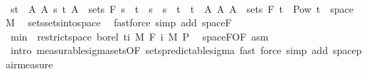 \begin{isabellebody}
\ \ \isacommand{{\isacharbraceright}{\kern0pt}}\isamarkupfalse%
\isanewline
\ \ \isamarkupfalse%
\ \isamarkupfalse%
\ {\isachardoublequoteopen}{\isacharbraceleft}{\kern0pt}{\isacharbraceleft}{\kern0pt}s{\isacharless}{\kern0pt}{\isachardot}{\kern0pt}{\isachardot}{\kern0pt}t{\isacharbraceright}{\kern0pt}\ {\isasymtimes}\ A\ {\isacharbar}{\kern0pt}A\ s\ t{\isachardot}{\kern0pt}\ A\ {\isasymin}\ sets\ {\isacharparenleft}{\kern0pt}F\ s{\isacharparenright}{\kern0pt}\ {\isasymand}\ t\ {\isasymle}\ s\ {\isasymand}\ s\ {\isacharless}{\kern0pt}\ t{\isacharbraceright}{\kern0pt}\ {\isasymunion}\ {\isacharbraceleft}{\kern0pt}{\isacharbraceleft}{\kern0pt}t\ {\isasymtimes}\ A\ {\isacharbar}{\kern0pt}A{\isachardot}{\kern0pt}\ A\ {\isasymin}\ sets\ {\isacharparenleft}{\kern0pt}F\ t\ {\isasymsubseteq}\ Pow\ {\isacharparenleft}{\kern0pt}{\isacharbraceleft}{\kern0pt}t\ {\isasymtimes}\ space\ M{\isacharparenright}{\kern0pt}{\isachardoublequoteclose}\ \isamarkupfalse%
\ sets{\isachardot}{\kern0pt}sets{\isacharunderscore}{\kern0pt}into{\isacharunderscore}{\kern0pt}space\ \isamarkupfalse%
\ {\isacharparenleft}{\kern0pt}fastforce\ simp\ add{\isacharcolon}{\kern0pt}\ space{\isacharunderscore}{\kern0pt}F{\isacharparenright}{\kern0pt}\isanewline
\ \ \isamarkupfalse%
\ \isamarkupfalse%
\ {\isachardoublequoteopen}{\isacharquery}{\kern0pt}min\ {\isasymin}\ restrict{\isacharunderscore}{\kern0pt}space\ borel\ {\isacharbraceleft}{\kern0pt}ti{\isacharbraceright}{\kern0pt}\ {\isasymOtimes}\isactrlsub M\ F\ i\ {\isasymrightarrow}\isactrlsub M\ {\isasymSigma}\isactrlsub P{\isachardoublequoteclose}\ \isamarkupfalse%
\ space{\isacharunderscore}{\kern0pt}F{\isacharbrackleft}{\kern0pt}OF\ asm{\isacharbrackright}{\kern0pt}\ \isamarkupfalse%
\ {\isacharparenleft}{\kern0pt}intro\ measurable{\isacharunderscore}{\kern0pt}sigma{\isacharunderscore}{\kern0pt}sets{\isacharbrackleft}{\kern0pt}OF\ sets{\isacharunderscore}{\kern0pt}predictable{\isacharunderscore}{\kern0pt}sigma{\isacharbrackright}{\kern0pt}{\isacharparenright}{\kern0pt}\ {\isacharparenleft}{\kern0pt}fast{\isacharcomma}{\kern0pt}\ force\ simp\ add{\isacharcolon}{\kern0pt}\ space{\isacharunderscore}{\kern0pt}pair{\isacharunderscore}{\kern0pt}measure{\isacharparenright}{\kern0pt}\isanewline

\end{isabellebody}
